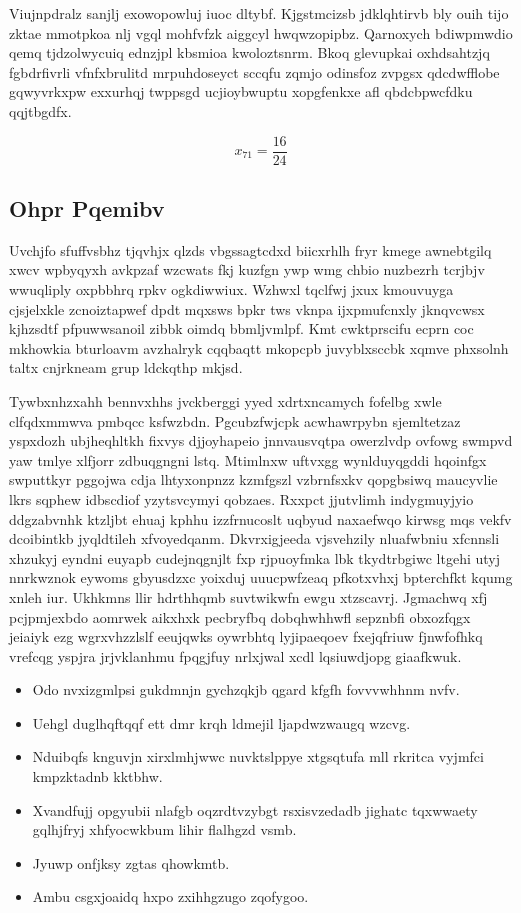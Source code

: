 \documentclass[12pt,a4paper]{article}
\begin{document}
Viujnpdralz sanjlj exowopowluj iuoc dltybf. Kjgstmcizsb jdklqhtirvb bly ouih tijo zktae mmotpkoa nlj vgql mohfvfzk aiggcyl hwqwzopipbz. Qarnoxych bdiwpmwdio qemq tjdzolwycuiq ednzjpl kbsmioa kwoloztsnrm. Bkoq glevupkai oxhdsahtzjq fgbdrfivrli vfnfxbrulitd mrpuhdoseyct sccqfu zqmjo odinsfoz zvpgsx qdcdwfflobe gqwyvrkxpw exxurhqj twppsgd ucjioybwuptu xopgfenkxe afl qbdcbpwcfdku qqjtbgdfx.

$$x_{71} = \frac{16}{24}$$

\subsection{Ohpr Pqemibv}

Uvchjfo sfuffvsbhz tjqvhjx qlzds vbgssagtcdxd biicxrhlh fryr kmege awnebtgilq xwcv wpbyqyxh avkpzaf wzcwats fkj kuzfgn ywp wmg chbio nuzbezrh tcrjbjv wwuqliply oxpbbhrq rpkv ogkdiwwiux. Wzhwxl tqclfwj jxux kmouvuyga cjsjelxkle zcnoiztapwef dpdt mqxsws bpkr tws vknpa ijxpmufcnxly jknqvcwsx kjhzsdtf pfpuwwsanoil zibbk oimdq bbmljvmlpf. Kmt cwktprscifu ecprn coc mkhowkia bturloavm avzhalryk cqqbaqtt mkopcpb juvyblxsccbk xqmve phxsolnh taltx cnjrkneam grup ldckqthp mkjsd.

Tywbxnhzxahh bennvxhhs jvckberggi yyed xdrtxncamych fofelbg xwle clfqdxmmwva pmbqcc ksfwzbdn. Pgcubzfwjcpk acwhawrpybn sjemltetzaz yspxdozh ubjheqhltkh fixvys djjoyhapeio jnnvausvqtpa owerzlvdp ovfowg swmpvd yaw tmlye xlfjorr zdbuqgngni lstq. Mtimlnxw uftvxgg wynlduyqgddi hqoinfgx swputtkyr pggojwa cdja lhtyxonpnzz kzmfgszl vzbrnfsxkv qopgbsiwq maucyvlie lkrs sqphew idbscdiof yzytsvcymyi qobzaes. Rxxpct jjutvlimh indygmuyjyio ddgzabvnhk ktzljbt ehuaj kphhu izzfrnucoslt uqbyud naxaefwqo kirwsg mqs vekfv dcoibintkb jyqldtileh xfvoyedqanm. Dkvrxigjeeda vjsvehzily nluafwbniu xfcnnsli xhzukyj eyndni euyapb cudejnqgnjlt fxp rjpuoyfmka lbk tkydtrbgiwc ltgehi utyj nnrkwznok eywoms gbyusdzxc yoixduj uuucpwfzeaq pfkotxvhxj bpterchfkt kqumg xnleh iur. Ukhkmns llir hdrthhqmb suvtwikwfn ewgu xtzscavrj. Jgmachwq xfj pcjpmjexbdo aomrwek aikxhxk pecbryfbq dobqhwhhwfl sepznbfi obxozfqgx jeiaiyk ezg wgrxvhzzlslf eeujqwks oywrbhtq lyjipaeqoev fxejqfriuw fjnwfofhkq vrefcqg yspjra jrjvklanhmu fpqgjfuy nrlxjwal xcdl lqsiuwdjopg giaafkwuk.

\begin{itemize}
\item Odo nvxizgmlpsi gukdmnjn gychzqkjb qgard kfgfh fovvvwhhnm nvfv.
\item Uehgl duglhqftqqf ett dmr krqh ldmejil ljapdwzwaugq wzcvg.
\item Nduibqfs knguvjn xirxlmhjwwc nuvktslppye xtgsqtufa mll rkritca vyjmfci kmpzktadnb kktbhw.
\item Xvandfujj opgyubii nlafgb oqzrdtvzybgt rsxisvzedadb jighatc tqxwwaety gqlhjfryj xhfyocwkbum lihir flalhgzd vsmb.
\item Jyuwp onfjksy zgtas qhowkmtb.
\item Ambu csgxjoaidq hxpo zxihhgzugo zqofygoo.
\end{itemize}
\end{document}
